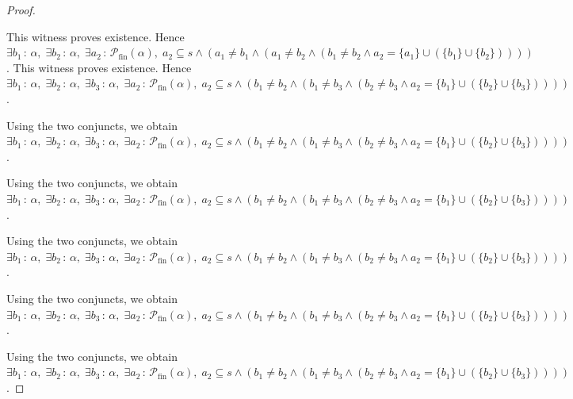 \documentclass{article}
\theoremstyle{paperresult}
\newenvironment{proofstep}{\par\smallskip\ifdim\leftskip<3em\relax\advance\leftskip by 1em\relax\fi\noindent\ignorespaces}{\par\smallskip}
\begin{document}
\begin{proof}
\begin{proofstep}
\begin{proofstep}
\begin{proofstep}
\begin{proofstep}
\begin{proofstep}
\begin{proofstep}
\begin{proofstep}
\begin{proofstep}
\begin{proofstep}
This witness proves existence. Hence \(\exists b_{1}\, :\, \alpha,\; \exists b_{2}\, :\, \alpha,\; \exists a_{2}\, :\, \mathcal{P}_{\mathrm{fin}}(\alpha),\; a_{2} \subseteq s \land (a_{1} \ne b_{1} \land (a_{1} \ne b_{2} \land (b_{1} \ne b_{2} \land a_{2} = \{a_{1}\} \cup (\{b_{1}\} \cup \{b_{2}\}))))\).
This witness proves existence. Hence \(\exists b_{1}\, :\, \alpha,\; \exists b_{2}\, :\, \alpha,\; \exists b_{3}\, :\, \alpha,\; \exists a_{2}\, :\, \mathcal{P}_{\mathrm{fin}}(\alpha),\; a_{2} \subseteq s \land (b_{1} \ne b_{2} \land (b_{1} \ne b_{3} \land (b_{2} \ne b_{3} \land a_{2} = \{b_{1}\} \cup (\{b_{2}\} \cup \{b_{3}\}))))\).
\end{proofstep}
Using the two conjuncts, we obtain \(\exists b_{1}\, :\, \alpha,\; \exists b_{2}\, :\, \alpha,\; \exists b_{3}\, :\, \alpha,\; \exists a_{2}\, :\, \mathcal{P}_{\mathrm{fin}}(\alpha),\; a_{2} \subseteq s \land (b_{1} \ne b_{2} \land (b_{1} \ne b_{3} \land (b_{2} \ne b_{3} \land a_{2} = \{b_{1}\} \cup (\{b_{2}\} \cup \{b_{3}\}))))\).
\end{proofstep}
Using the two conjuncts, we obtain \(\exists b_{1}\, :\, \alpha,\; \exists b_{2}\, :\, \alpha,\; \exists b_{3}\, :\, \alpha,\; \exists a_{2}\, :\, \mathcal{P}_{\mathrm{fin}}(\alpha),\; a_{2} \subseteq s \land (b_{1} \ne b_{2} \land (b_{1} \ne b_{3} \land (b_{2} \ne b_{3} \land a_{2} = \{b_{1}\} \cup (\{b_{2}\} \cup \{b_{3}\}))))\).
\end{proofstep}
Using the two conjuncts, we obtain \(\exists b_{1}\, :\, \alpha,\; \exists b_{2}\, :\, \alpha,\; \exists b_{3}\, :\, \alpha,\; \exists a_{2}\, :\, \mathcal{P}_{\mathrm{fin}}(\alpha),\; a_{2} \subseteq s \land (b_{1} \ne b_{2} \land (b_{1} \ne b_{3} \land (b_{2} \ne b_{3} \land a_{2} = \{b_{1}\} \cup (\{b_{2}\} \cup \{b_{3}\}))))\).
\end{proofstep}
Using the two conjuncts, we obtain \(\exists b_{1}\, :\, \alpha,\; \exists b_{2}\, :\, \alpha,\; \exists b_{3}\, :\, \alpha,\; \exists a_{2}\, :\, \mathcal{P}_{\mathrm{fin}}(\alpha),\; a_{2} \subseteq s \land (b_{1} \ne b_{2} \land (b_{1} \ne b_{3} \land (b_{2} \ne b_{3} \land a_{2} = \{b_{1}\} \cup (\{b_{2}\} \cup \{b_{3}\}))))\).
\end{proofstep}
Using the two conjuncts, we obtain \(\exists b_{1}\, :\, \alpha,\; \exists b_{2}\, :\, \alpha,\; \exists b_{3}\, :\, \alpha,\; \exists a_{2}\, :\, \mathcal{P}_{\mathrm{fin}}(\alpha),\; a_{2} \subseteq s \land (b_{1} \ne b_{2} \land (b_{1} \ne b_{3} \land (b_{2} \ne b_{3} \land a_{2} = \{b_{1}\} \cup (\{b_{2}\} \cup \{b_{3}\}))))\).
\end{proofstep}

\end{proofstep}
\end{proofstep}
\end{proofstep}
\end{proof}
\end{document}

